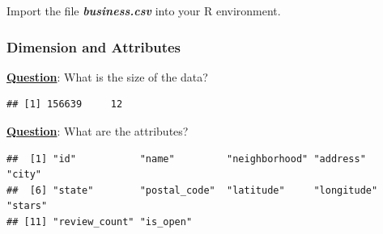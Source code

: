 \documentclass[12pt]{book}\usepackage{knitr}
\begin{document}
\noindent Import the file \emph{\textbf{business.csv}} into your R environment. 


\subsubsection{Dimension and Attributes}
\noindent \textbf{\underline{Question}}: What is the size of the data?
\begin{knitrout}
\color{fgcolor}\begin{kframe}
\begin{alltt}
\end{alltt}
\begin{verbatim}
## [1] 156639     12
\end{verbatim}
\begin{alltt}
\end{alltt}
\end{kframe}
\end{knitrout}

\noindent \textbf{\underline{Question}}: What are the attributes?
\begin{knitrout}
\color{fgcolor}\begin{kframe}
\begin{alltt}
\end{alltt}
\begin{verbatim}
##  [1] "id"           "name"         "neighborhood" "address"      "city"        
##  [6] "state"        "postal_code"  "latitude"     "longitude"    "stars"       
## [11] "review_count" "is_open"
\end{verbatim}
\begin{alltt}
\end{alltt}
\end{kframe}
\end{knitrout}

\newpage
\end{document}
